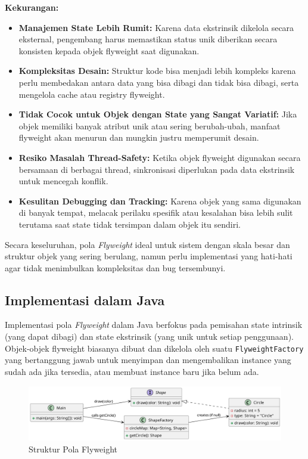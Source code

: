 \textbf{Kekurangan:}
\begin{itemize}
	\item \textbf{Manajemen State Lebih Rumit:} Karena data ekstrinsik dikelola secara eksternal, pengembang harus memastikan status unik diberikan secara konsisten kepada objek flyweight saat digunakan.
	
	\item \textbf{Kompleksitas Desain:} Struktur kode bisa menjadi lebih kompleks karena perlu membedakan antara data yang bisa dibagi dan tidak bisa dibagi, serta mengelola cache atau registry flyweight.
	
	\item \textbf{Tidak Cocok untuk Objek dengan State yang Sangat Variatif:} Jika objek memiliki banyak atribut unik atau sering berubah-ubah, manfaat flyweight akan menurun dan mungkin justru memperumit desain.
	
	\item \textbf{Resiko Masalah Thread-Safety:} Ketika objek flyweight digunakan secara bersamaan di berbagai thread, sinkronisasi diperlukan pada data ekstrinsik untuk mencegah konflik.
	
	\item \textbf{Kesulitan Debugging dan Tracking:} Karena objek yang sama digunakan di banyak tempat, melacak perilaku spesifik atau kesalahan bisa lebih sulit terutama saat state tidak tersimpan dalam objek itu sendiri.
\end{itemize}

Secara keseluruhan, pola \textit{Flyweight} ideal untuk sistem dengan skala besar dan struktur objek yang sering berulang, namun perlu implementasi yang hati-hati agar tidak menimbulkan kompleksitas dan bug tersembunyi.


\subsection{Implementasi dalam Java}

Implementasi pola \textit{Flyweight} dalam Java berfokus pada pemisahan state intrinsik (yang dapat dibagi) dan state ekstrinsik (yang unik untuk setiap penggunaan). Objek-objek flyweight biasanya dibuat dan dikelola oleh suatu \texttt{FlyweightFactory} yang bertanggung jawab untuk menyimpan dan mengembalikan instance yang sudah ada jika tersedia, atau membuat instance baru jika belum ada.

\begin{figure}[h]
	\centering
	\includegraphics[width=\textwidth]{../figures/out/flyweight.png}
	\caption{Struktur Pola Flyweight}
	\label{fig:flyweight}
\end{figure}

